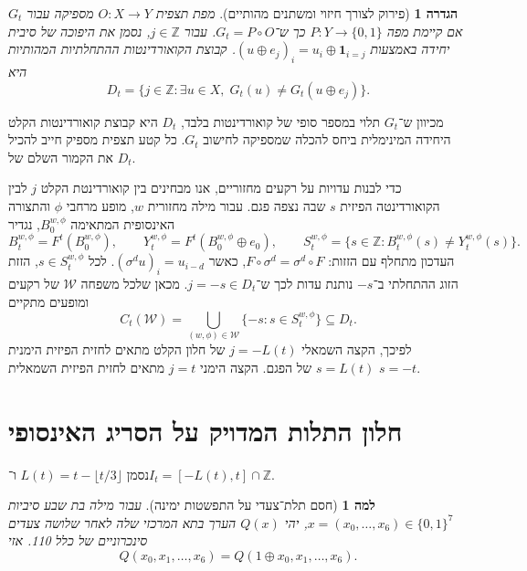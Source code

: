 \documentclass[11pt,a4paper]{article}
\newtheorem{lemma}[theorem]{למה}
\newtheorem{definition}[theorem]{הגדרה}
\begin{document}
\begin{definition}[פירוק לצורך חיזוי ומשתנים מהותיים]
מפת תצפית $O : X \to Y$ מספיקה עבור $G_t$ אם קיימת מפה $P : Y \to \{0, 1\}$ כך ש־$G_t = P \circ O$. עבור $j \in \mathbb{Z}$, נסמן את היפוכה של סיבית יחידה באמצעות $(u \oplus e_j)_i = u_i \oplus \mathbf{1}_{i=j}$. קבוצת הקואורדינטות ההתחלתיות המהותיות היא
\begin{equation}\label{eq:essential_set}
D_t = \{ j \in \mathbb{Z} : \exists u \in X,\; G_t(u) \ne G_t(u \oplus e_j) \}.
\end{equation}
\end{definition}

מכיוון ש־$G_t$ תלוי במספר סופי של קואורדינטות בלבד, $D_t$ היא קבוצת קואורדינטות הקלט היחידה המינימלית ביחס להכלה שמספיקה לחישוב $G_t$. כל קטע תצפית מספיק חייב להכיל את הקמור השלם של $D_t$.

כדי לבנות עדויות על רקעים מחזוריים, אנו מבחינים בין קואורדינטת הקלט $j$ לבין הקואורדינטה הפיזית $s$ שבה נצפה פגם. עבור מילה מחזורית $w$, מופע מרחבי $\phi$ והתצורה האינסופית המתאימה $B_0^{w,\phi}$, נגדיר
\begin{equation}\label{eq:diff_support}
B_t^{w,\phi} = F^t(B_0^{w,\phi}), \qquad
Y_t^{w,\phi} = F^t(B_0^{w,\phi} \oplus e_0), \qquad
S_t^{w,\phi} = \{ s \in \mathbb{Z} : B_t^{w,\phi}(s) \ne Y_t^{w,\phi}(s) \}.
\end{equation}
העדכון מתחלף עם הזזות: $F \circ \sigma^d = \sigma^d \circ F$, כאשר $(\sigma^d u)_i = u_{i-d}$. לכל $s \in S_t^{w,\phi}$, הזזת הזוג ההתחלתי ב־$-s$ נותנת עדות לכך ש־$j = -s \in D_t$. מכאן שלכל משפחה $\mathcal{W}$ של רקעים ומופעים מתקיים
\begin{equation}\label{eq:coverage_bridge}
C_t(\mathcal{W}) = \bigcup_{(w,\phi) \in \mathcal{W}} \{ -s : s \in S_t^{w,\phi} \} \subseteq D_t.
\end{equation}
לפיכך, הקצה השמאלי $j = -L(t)$ של חלון הקלט מתאים לחזית הפיזית הימנית $s = L(t)$ של הפגם. הקצה הימני $j = t$ מתאים לחזית הפיזית השמאלית $s = -t$.

\section{חלון התלות המדויק על הסריג האינסופי}

נסמן $L(t) = t - \lfloor t/3 \rfloor$ ו־$I_t = [-L(t), t] \cap \mathbb{Z}$.

\begin{lemma}[חסם תלת־צעדי על התפשטות ימינה]\label{lem:three_step}
עבור מילה בת שבע סיביות $x = (x_0, \dots, x_6) \in \{0, 1\}^7$, יהי $Q(x)$ הערך בתא המרכזי שלה לאחר שלושה צעדים סינכרוניים של כלל 110. אזי
\begin{equation}\label{eq:seven_bit}
Q(x_0, x_1, \dots, x_6) = Q(1 \oplus x_0, x_1, \dots, x_6).
\end{equation}
\end{lemma}
\end{document}
